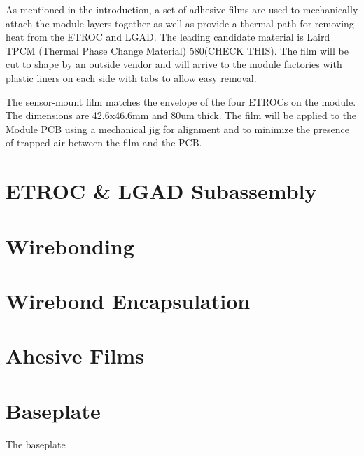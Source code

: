 \documentclass[10pt]{datasheet}
\begin{document}
As mentioned in the introduction, a set of adhesive films are used to mechanically attach the module layers together as well as provide a thermal path for removing heat from the ETROC and LGAD. The leading candidate material is Laird TPCM (Thermal Phase Change Material) 580(CHECK THIS). The film will be cut to shape by an outside vendor and will arrive to the module factories with plastic liners on each side with tabs to allow easy removal.

The sensor-mount film matches the envelope of the four ETROCs on the module. The dimensions are 42.6x46.6mm and 80um thick. The film will be applied to the Module PCB using a mechanical jig for alignment and to minimize the presence of trapped air between the film and the PCB.


\section{ETROC \& LGAD Subassembly}


\section{Wirebonding}


\section{Wirebond Encapsulation}


\section{Ahesive Films}



\section{Baseplate}

The baseplate 
\end{document}
